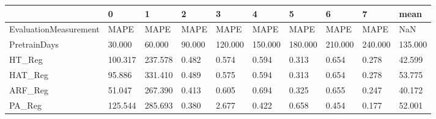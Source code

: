 \begin{tabular}{llllllllll}
\toprule
{} &       0 &       1 &      2 &       3 &       4 &       5 &       6 &       7 &    mean \\
\midrule
EvaluationMeasurement &    MAPE &    MAPE &   MAPE &    MAPE &    MAPE &    MAPE &    MAPE &    MAPE &     NaN \\
PretrainDays          &  30.000 &  60.000 & 90.000 & 120.000 & 150.000 & 180.000 & 210.000 & 240.000 & 135.000 \\
HT\_Reg                & 100.317 & 237.578 &  0.482 &   0.574 &   0.594 &   0.313 &   0.654 &   0.278 &  42.599 \\
HAT\_Reg               &  95.886 & 331.410 &  0.489 &   0.575 &   0.594 &   0.313 &   0.654 &   0.278 &  53.775 \\
ARF\_Reg               &  51.047 & 267.390 &  0.413 &   0.605 &   0.694 &   0.325 &   0.655 &   0.247 &  40.172 \\
PA\_Reg                & 125.544 & 285.693 &  0.380 &   2.677 &   0.422 &   0.658 &   0.454 &   0.177 &  52.001 \\
\bottomrule
\end{tabular}
